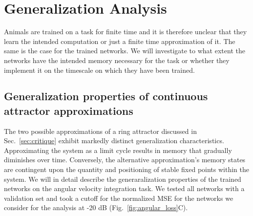 \documentclass{article} %
\newcounter{ct}
\theoremstyle{definition}
\theoremstyle{remark}
\begin{document}
\section{Generalization Analysis}


Animals are trained on a task for finite time and it is therefore unclear that they learn the intended computation or just a finite time approximation of it.
The same is the case for the trained networks.
We will investigate to what extent the networks have the intended memory necessary for the task or whether they implement it on the timescale on which they have been trained.


\subsection{Generalization properties of continuous attractor approximations}\label{sec:generalization}

The two possible approximations of a ring attractor discussed in Sec.~\ref{sec:critique} exhibit markedly distinct generalization characteristics.
Approximating the system as a limit cycle results in memory that gradually diminishes over time.
Conversely, the alternative approximation's memory states are contingent upon the quantity and positioning of stable fixed points within the system.
We will in detail describe the generaralization properties of the trained networks on the angular velocity integration task.
We tested all networks with a validation set and took a cutoff for the normalized MSE for the networks we consider for the analysis at -20 dB (Fig.~\ref{fig:angular_loss}C).
\end{document}
